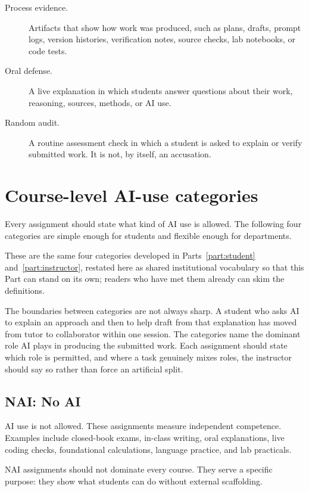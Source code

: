 \documentclass{SIAMbook2023}
\newcommand{\NAI}{\textcolor{catNAI}{\textbf{NAI}}}
\begin{document}
\begin{description}
  \item[Process evidence.] Artifacts that show how work was produced, such as plans, drafts, prompt logs, version histories, verification notes, source checks, lab notebooks, or code tests.
  \item[Oral defense.] A live explanation in which students answer questions about their work, reasoning, sources, methods, or AI use.
  \item[Random audit.] A routine assessment check in which a student is asked to explain or verify submitted work. It is not, by itself, an accusation.
\end{description}

\section{Course-level AI-use categories}
\label{u:sec:categories}%

Every assignment should state what kind of AI use is allowed. The following four categories are simple enough for students and flexible enough for departments.

These are the same four categories developed in Parts~\ref{part:student} and~\ref{part:instructor}, restated here as shared institutional vocabulary so that this Part can stand on its own; readers who have met them already can skim the definitions.

The boundaries between categories are not always sharp. A student who asks AI to explain an approach and then to help draft from that explanation has moved from tutor to collaborator within one session. The categories name the dominant role AI plays in producing the submitted work. Each assignment should state which role is permitted, and where a task genuinely mixes roles, the instructor should say so rather than force an artificial split.

\subsection{\texorpdfstring{\NAI{}: No AI}{NAI: No AI}}
\label{u:subsec:red}

AI use is not allowed. These assignments measure independent competence. Examples include closed-book exams, in-class writing, oral explanations, live coding checks, foundational calculations, language practice, and lab practicals.

NAI assignments should not dominate every course. They serve a specific purpose: they show what students can do without external scaffolding.
\end{document}
